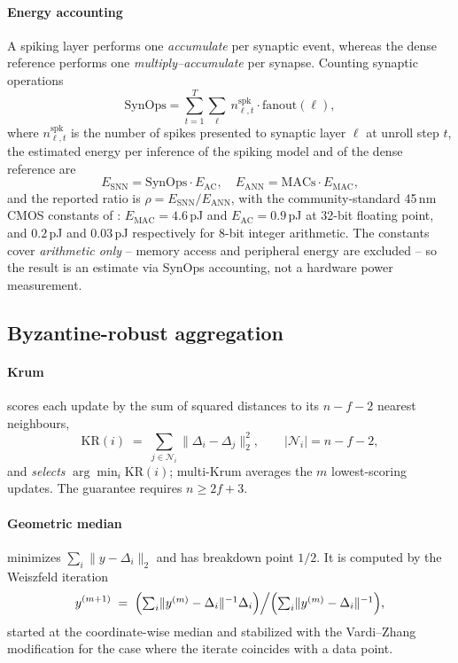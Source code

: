 \documentclass[review,12pt]{elsarticle}
\begin{document}
\paragraph{Energy accounting}
A spiking layer performs one \emph{accumulate} per synaptic event, whereas
the dense reference performs one \emph{multiply--accumulate} per synapse.
Counting synaptic operations
\begin{equation}
\mathrm{SynOps} = \sum_{t=1}^{T} \sum_{\ell}\ n^{\mathrm{spk}}_{\ell,t} \cdot \mathrm{fanout}(\ell),
\label{eq:synops}
\end{equation}
where $n^{\mathrm{spk}}_{\ell,t}$ is the number of spikes presented to
synaptic layer $\ell$ at unroll step $t$, the estimated energy per
inference of the spiking model and of the dense reference are
\begin{equation}
E_{\mathrm{SNN}} = \mathrm{SynOps}\cdot E_{\mathrm{AC}},
\quad
E_{\mathrm{ANN}} = \mathrm{MACs}\cdot E_{\mathrm{MAC}},
\label{eq:energy}
\end{equation}
and the reported ratio is $\rho = E_{\mathrm{SNN}} / E_{\mathrm{ANN}}$,
with the community-standard 45\,nm CMOS constants of \cite{horowitz2014}:
$E_{\mathrm{MAC}}=4.6$\,pJ and $E_{\mathrm{AC}}=0.9$\,pJ at 32-bit
floating point, and $0.2$\,pJ and $0.03$\,pJ respectively for 8-bit
integer arithmetic. The constants cover \emph{arithmetic only} -- memory
access and peripheral energy are excluded -- so the result is an estimate
via SynOps accounting, not a hardware power measurement.

\subsection{Byzantine-robust aggregation}
\label{sec:sup-byz}

\paragraph{Krum} \cite{blanchard2017} scores each update by the sum of
squared distances to its $n-f-2$ nearest neighbours,
\begin{equation}
\mathrm{KR}(i) \;=\; \sum_{j \in \mathcal{N}_i} \lVert \Delta_i - \Delta_j \rVert_2^2 ,
\qquad |\mathcal{N}_i| = n - f - 2 ,
\label{eq:krum}
\end{equation}
and \emph{selects} $\arg\min_i \mathrm{KR}(i)$; multi-Krum averages the
$m$ lowest-scoring updates. The guarantee requires $n \ge 2f+3$.

\paragraph{Geometric median} \cite{pillutla2022} minimizes
$\sum_i \lVert y - \Delta_i \rVert_2$ and has breakdown point $1/2$. It is
computed by the Weiszfeld iteration
\begin{equation}
y^{(m+1)} \;=\; \Bigl(\textstyle\sum_i \lVert y^{(m)}-\Delta_i\rVert^{-1}\Delta_i\Bigr)\Big/\Bigl(\textstyle\sum_i \lVert y^{(m)}-\Delta_i\rVert^{-1}\Bigr),
\label{eq:weiszfeld}
\end{equation}
started at the coordinate-wise median and stabilized with the
Vardi--Zhang modification \cite{vardi2000} for the case where the iterate
coincides with a data point.
\end{document}
